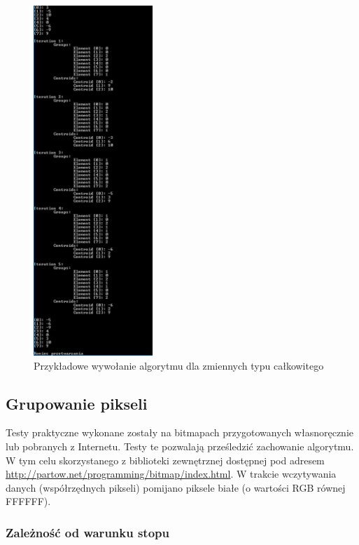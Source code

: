 \begin{figure}[!h]
	\centering
	\includegraphics[width=0.40\textwidth]{./img/intTest.png}
	\caption{Przykładowe wywołanie algorytmu dla zmiennych typu całkowitego}
	\label{img:intTest}
\end{figure}

\subsection{Grupowanie pikseli}

Testy praktyczne wykonane zostały na bitmapach przygotowanych własnoręcznie lub pobranych z Internetu. Testy te pozwalają prześledzić zachowanie algorytmu. W tym celu skorzystanego z biblioteki zewnętrznej dostępnej pod adresem \url{http://partow.net/programming/bitmap/index.html}. W trakcie wczytywania danych (współrzędnych pikseli) pomijano piksele białe (o wartości RGB równej FFFFFF).

\subsubsection{Zależność od warunku stopu}

